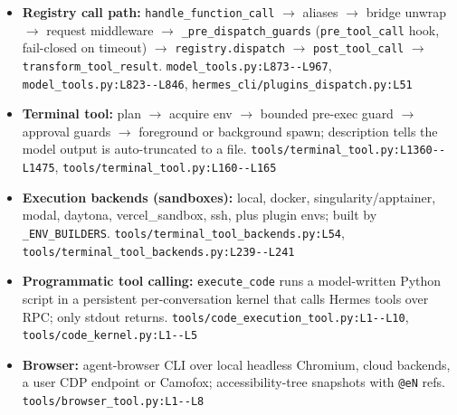 \begin{itemize}
\item \textbf{Registry call path:} \texttt{handle\_\allowbreak{}function\_\allowbreak{}call} $\rightarrow$ aliases $\rightarrow$ bridge unwrap $\rightarrow$ request middleware $\rightarrow$ \texttt{\_\allowbreak{}pre\_\allowbreak{}dispatch\_\allowbreak{}guards} (\texttt{pre\_\allowbreak{}tool\_\allowbreak{}call} hook, fail-closed on timeout) $\rightarrow$ \texttt{registry.\allowbreak{}dispatch} $\rightarrow$ \texttt{post\_\allowbreak{}tool\_\allowbreak{}call} $\rightarrow$ \texttt{transform\_\allowbreak{}tool\_\allowbreak{}result}. \texttt{model\_\allowbreak{}tools.\allowbreak{}py:\allowbreak{}L873-\allowbreak{}-\allowbreak{}L967}, \texttt{model\_\allowbreak{}tools.\allowbreak{}py:\allowbreak{}L823-\allowbreak{}-\allowbreak{}L846}, \texttt{hermes\_\allowbreak{}cli/\allowbreak{}plugins\_\allowbreak{}dispatch.\allowbreak{}py:\allowbreak{}L51}
\item \textbf{Terminal tool:} plan $\rightarrow$ acquire env $\rightarrow$ bounded pre-exec guard $\rightarrow$ approval guards $\rightarrow$ foreground or background spawn; description tells the model output is auto-truncated to a file. \texttt{tools/\allowbreak{}terminal\_\allowbreak{}tool.\allowbreak{}py:\allowbreak{}L1360-\allowbreak{}-\allowbreak{}L1475}, \texttt{tools/\allowbreak{}terminal\_\allowbreak{}tool.\allowbreak{}py:\allowbreak{}L160-\allowbreak{}-\allowbreak{}L165}
\item \textbf{Execution backends (sandboxes):} local, docker, singularity/apptainer, modal, daytona, vercel\_sandbox, ssh, plus plugin envs; built by \texttt{\_\allowbreak{}ENV\_\allowbreak{}BUILDERS}. \texttt{tools/\allowbreak{}terminal\_\allowbreak{}tool\_\allowbreak{}backends.\allowbreak{}py:\allowbreak{}L54}, \texttt{tools/\allowbreak{}terminal\_\allowbreak{}tool\_\allowbreak{}backends.\allowbreak{}py:\allowbreak{}L239-\allowbreak{}-\allowbreak{}L241}
\item \textbf{Programmatic tool calling:} \texttt{execute\_\allowbreak{}code} runs a model-written Python script in a persistent per-conversation kernel that calls Hermes tools over RPC; only stdout returns. \texttt{tools/\allowbreak{}code\_\allowbreak{}execution\_\allowbreak{}tool.\allowbreak{}py:\allowbreak{}L1-\allowbreak{}-\allowbreak{}L10}, \texttt{tools/\allowbreak{}code\_\allowbreak{}kernel.\allowbreak{}py:\allowbreak{}L1-\allowbreak{}-\allowbreak{}L5}
\item \textbf{Browser:} agent-browser CLI over local headless Chromium, cloud backends, a user CDP endpoint or Camofox; accessibility-tree snapshots with \texttt{@eN} refs. \texttt{tools/\allowbreak{}browser\_\allowbreak{}tool.\allowbreak{}py:\allowbreak{}L1-\allowbreak{}-\allowbreak{}L8}

\end{itemize}
